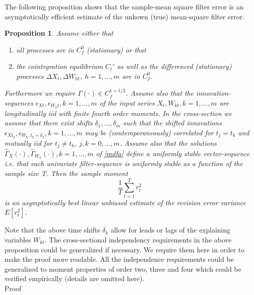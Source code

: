 \documentclass[11pt]{article}
\newtheorem{Proposition}{Proposition}
\begin{document}
\begin{appendix}
The following proposition shows that the sample-mean square filter error is an asymptotically efficient estimate of the unkown (true) mean-square filter error. 
\begin{Proposition}\label{propbluee}
Assume either that
\begin{enumerate}
\item all processes are in $C_f^0$ (stationary) or that
\item the cointegration equilibrium $C_t'$ as well as the differenced (stationary)
processes $\Delta X_t,\Delta W_{ht}$, $h=1,...,m$ are in $C_f^0$.
\end{enumerate}
Furthermore we require $\Gamma(\cdot)\in C_f^{1+1/2}$. Assume also
that the innovation-sequences \(\epsilon_{Xt},\epsilon_{W_kt},
k=1,...,m\) of the input series $X_t, W_{kt}, k=1,...,m$ are
longitudinally iid with finite fourth order moments. In the
cross-section we assume that there exist shifts
$\delta_1,...,\delta_m$ such that the shifted innovations
\(\epsilon_{Xt_0},\epsilon_{W_k,t_k+\delta_k}, k=1,...,m\) may be
(contemporaneously) correlated for $t_j=t_k$ and mutually iid for
$t_j\not= t_k$, $j,k=0,...,m$. Assume also that the solutions
\(\hat{\Gamma}_X(\cdot),\hat{\Gamma}_{W_k}(\cdot),k=1,...,m\) of
\ref{mdfa} define a uniformly stable vector-sequence i.e. that each
univariate filter-sequence is uniformly stable as a function of the
sample size T. Then the sample moment
\[\frac{1}{T}\sum_{t=1}^Tr_t^2\]
is an asymptotically best linear unbiased estimate of the revision
error variance \(E[r_t^2]\).
\end{Proposition}
Note that the above time shifts $\delta_k$ allow for leads or lags
of the explaining variables $W_{kt}$. The cross-sectional
independency requirements in the above proposition could be
generalized if necessary. We require them here in order to make the
proof more readable. All the independence requirements could be
generalized to moment properties of order two, three and four which
could be verified empirically (details are omitted here).\\

Proof\\


\end{appendix}
\end{document}
